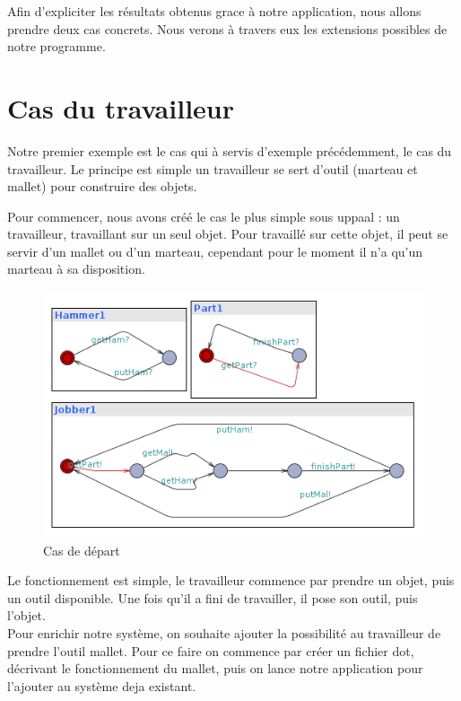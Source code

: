 \documentclass[12pt,a4paper]{report}
\begin{document}
    Afin d'expliciter les résultats obtenus grace à notre application, nous allons prendre deux cas concrets. Nous verons à travers eux les extensions possibles de notre programme.
    
    \section{Cas du travailleur}
    
    Notre premier exemple est le cas qui à servis d'exemple précédemment, le cas du travailleur. Le principe est simple un travailleur se sert d'outil (marteau et mallet) pour construire des objets.
    
    Pour commencer, nous avons créé le cas le plus simple sous uppaal : un travailleur, travaillant sur un seul objet. Pour travaillé sur cette objet, il peut se servir d'un mallet ou d'un marteau, cependant pour le moment il n'a qu'un marteau à sa disposition.

\begin{figure}[h]
  \centering
  \includegraphics[scale=0.6]{ressources/workerBasic.png}
  \caption{Cas de départ}
\end{figure}

    Le fonctionnement est simple, le travailleur commence par prendre un objet, puis un outil disponible. Une fois qu'il a fini de travailler, il pose son outil, puis l'objet.\\
    
    Pour enrichir notre système, on souhaite ajouter la possibilité au travailleur de prendre l'outil mallet. Pour ce faire on commence par créer un fichier dot, décrivant le fonctionnement du mallet, puis on lance notre application pour l'ajouter au système deja existant.
    
\end{document}
